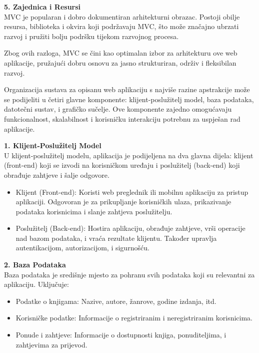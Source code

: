  \textbf{5. Zajednica i Resursi}\\

MVC je popularan i dobro dokumentiran arhitekturni obrazac. Postoji obilje resursa, biblioteka i okvira koji podržavaju MVC, što može značajno ubrzati razvoj i pružiti bolju podršku tijekom razvojnog procesa.

Zbog ovih razloga, MVC se čini kao optimalan izbor za arhitekturu ove web aplikacije, pružajući dobru osnovu za jasno strukturiran, održiv i fleksibilan razvoj.


Organizacija sustava za opisanu web aplikaciju s najviše razine apstrakcije može se podijeliti u četiri glavne komponente: klijent-poslužitelj model, baza podataka, datotečni sustav, i grafičko sučelje. Ove komponente zajedno omogućavaju funkcionalnost, skalabilnost i korisničku interakciju potrebnu za uspješan rad aplikacije.

 \textbf{1. Klijent-Poslužitelj Model}\\

U klijent-poslužitelj modelu, aplikacija je podijeljena na dva glavna dijela: klijent (front-end) koji se izvodi na korisničkom uređaju i poslužitelj (back-end) koji obrađuje zahtjeve i šalje odgovore.
\begin{itemize}
		  \item {Klijent (Front-end): Koristi web preglednik ili mobilnu aplikaciju za pristup aplikaciji. Odgovoran je za prikupljanje korisničkih ulaza, prikazivanje podataka korisnicima i slanje zahtjeva poslužitelju.}
		  \item {Poslužitelj (Back-end): Hostira aplikaciju, obrađuje zahtjeve, vrši operacije nad bazom podataka, i vraća rezultate klijentu. Također upravlja autentikacijom, autorizacijom, i sigurnošću.}	
	   \end{itemize}


 \textbf{2. Baza Podataka}\\

Baza podataka je središnje mjesto za pohranu svih podataka koji su relevantni za aplikaciju. Uključuje:
\begin{itemize}
		  \item {Podatke o knjigama: Nazive, autore, žanrove, godine izdanja, itd.}
		  \item {Korisničke podatke: Informacije o registriranim i neregistriranim korisnicima.}	
            \item {Ponude i zahtjeve: Informacije o dostupnosti knjiga, ponuditeljima, i zahtjevima za prijevod.}
	   \end{itemize}


